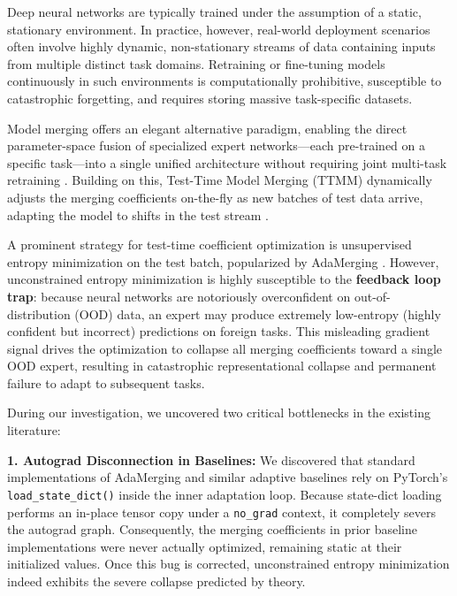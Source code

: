 \documentclass{article}
\theoremstyle{plain}
\theoremstyle{definition}
\theoremstyle{remark}
\begin{document}
Deep neural networks are typically trained under the assumption of a static, stationary environment. In practice, however, real-world deployment scenarios often involve highly dynamic, non-stationary streams of data containing inputs from multiple distinct task domains. Retraining or fine-tuning models continuously in such environments is computationally prohibitive, susceptible to catastrophic forgetting, and requires storing massive task-specific datasets.

Model merging offers an elegant alternative paradigm, enabling the direct parameter-space fusion of specialized expert networks---each pre-trained on a specific task---into a single unified architecture without requiring joint multi-task retraining \cite{wortsman2022model, ilharco2022editing, stoica2023zipit}. Building on this, Test-Time Model Merging (TTMM) dynamically adjusts the merging coefficients on-the-fly as new batches of test data arrive, adapting the model to shifts in the test stream \cite{liang2023adamerging, anonymous2026dfbayes}.

A prominent strategy for test-time coefficient optimization is unsupervised entropy minimization on the test batch, popularized by AdaMerging \cite{liang2023adamerging}. However, unconstrained entropy minimization is highly susceptible to the \textbf{feedback loop trap}: because neural networks are notoriously overconfident on out-of-distribution (OOD) data, an expert may produce extremely low-entropy (highly confident but incorrect) predictions on foreign tasks. This misleading gradient signal drives the optimization to collapse all merging coefficients toward a single OOD expert, resulting in catastrophic representational collapse and permanent failure to adapt to subsequent tasks.

During our investigation, we uncovered two critical bottlenecks in the existing literature:

\textbf{1. Autograd Disconnection in Baselines:} We discovered that standard implementations of AdaMerging and similar adaptive baselines rely on PyTorch's \texttt{load\_state\_dict()} inside the inner adaptation loop. Because state-dict loading performs an in-place tensor copy under a \texttt{no\_grad} context, it completely severs the autograd graph. Consequently, the merging coefficients in prior baseline implementations were never actually optimized, remaining static at their initialized values. Once this bug is corrected, unconstrained entropy minimization indeed exhibits the severe collapse predicted by theory.
\end{document}
